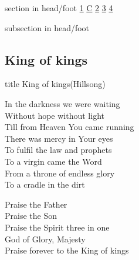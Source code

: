 \documentclass{beamer}
\begin{document}
{
{ 
 {
 \begin{beamercolorbox}[ht=4.5ex,dp=1.5ex,%
      leftskip=.3cm,rightskip=.3cm plus1fil]{section in head/foot}
 \fontsize{12}{25}\selectfont 
\hyperlink{King of kings[](Hillsong)1}{1}
\hyperlink{King of kings[](Hillsong)C}{C}
\hyperlink{King of kings[](Hillsong)2}{2}
\hyperlink{King of kings[](Hillsong)3}{3}
\hyperlink{King of kings[](Hillsong)4}{4}
 
 \end{beamercolorbox}%
  \begin{beamercolorbox}[ht=2.5ex,dp=1.125ex,%
   leftskip=.3cm,rightskip=.3cm plus1fil]{subsection in head/foot}
   \insertauthor
 \end{beamercolorbox}%
 }
}
\subsection{ King of kings }

\hypertarget{King of kings[](Hillsong)}{}
\begin{frame}{}
 \vfill
  \centering
  \begin{beamercolorbox}[sep=8pt,center,shadow=true,rounded=true]{title}
    King of kings(Hillsong)    
  \end{beamercolorbox}
  \vfill
\end{frame}

\hypertarget{King of kings[](Hillsong)1}{}
\begin{frame}{}
\fontsize{ 18 }{ 23 }\selectfont

In the darkness we were waiting\\ 
Without hope without light\\ 
Till from Heaven You came running\\ 
There was mercy in Your eyes\\ 
To fulfil the law and prophets\\ 
To a virgin came the Word\\ 
From a throne of endless glory\\ 
To a cradle in the dirt 

\end{frame}

\hypertarget{King of kings[](Hillsong)C}{}
\begin{frame}{}
\fontsize{ 18 }{ 23 }\selectfont

Praise the Father\\ 
Praise the Son\\ 
Praise the Spirit three in one\\ 
God of Glory, Majesty\\ 
Praise forever to the King of kings 


\end{frame}}
\end{document}
